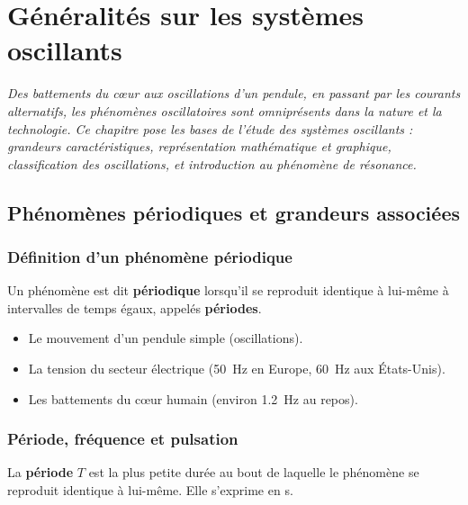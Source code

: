\chapter{Généralités sur les systèmes oscillants}

\textit{Des battements du cœur aux oscillations d'un pendule, en passant par les courants alternatifs, les phénomènes oscillatoires sont omniprésents dans la nature et la technologie. Ce chapitre pose les bases de l'étude des systèmes oscillants : grandeurs caractéristiques, représentation mathématique et graphique, classification des oscillations, et introduction au phénomène de résonance.}

\section{Phénomènes périodiques et grandeurs associées}

\subsection{Définition d'un phénomène périodique}

\begin{definition}
Un phénomène est dit \textbf{périodique} lorsqu'il se reproduit identique à lui-même à intervalles de temps égaux, appelés \textbf{périodes}.
\end{definition}

\begin{exemple}
\begin{itemize}
\item Le mouvement d'un pendule simple (oscillations).
\item La tension du secteur électrique (\SI{50}{\hertz} en Europe, \SI{60}{\hertz} aux États-Unis).
\item Les battements du cœur humain (environ \SI{1.2}{\hertz} au repos).
\end{itemize}
\end{exemple}

\subsection{Période, fréquence et pulsation}

\begin{definition}[Période $T$]
La \textbf{période} $T$ est la plus petite durée au bout de laquelle le phénomène se reproduit identique à lui-même. Elle s'exprime en \si{\second}.
\end{definition}

